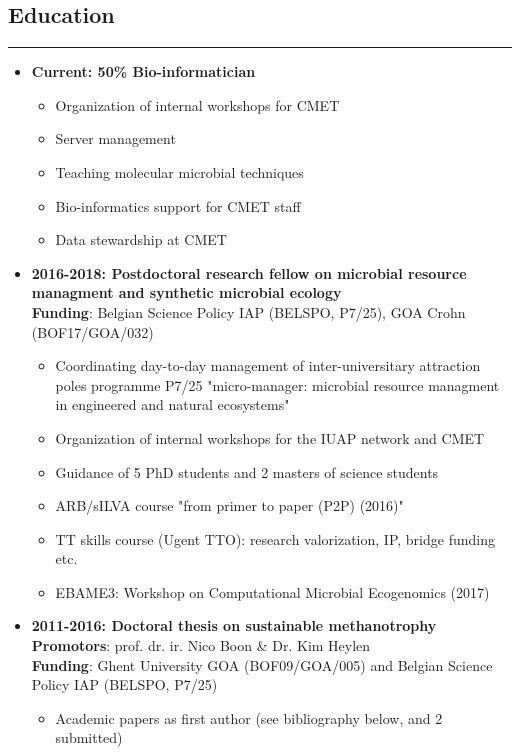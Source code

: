 \documentclass[a4paper,11pt,oneside]{article}
\begin{document}
\subsection*{Education}
\rule{\textwidth}{1pt}
\begin{itemize}
\item \textbf{Current: 50\% Bio-informatician}
  \begin{itemize}
    \item Organization of internal workshops for CMET
    \item Server management
    \item Teaching molecular microbial techniques
    \item Bio-informatics support for CMET staff
    \item Data stewardship at CMET
  \end{itemize}
\item \textbf{2016-2018: Postdoctoral research fellow on microbial resource managment and synthetic microbial ecology} \\
\textbf{Funding}: Belgian Science Policy IAP (BELSPO, P7/25), GOA Crohn (BOF17/GOA/032) 
    \begin{itemize}
      \item Coordinating day-to-day management of inter-universitary attraction poles programme P7/25 "micro-manager: microbial resource managment in engineered and natural ecosystems"
      \item Organization of internal workshops for the IUAP network and CMET
      \item Guidance of 5 PhD students and 2 masters of science students
      \item ARB/sILVA course "from primer to paper (P2P) (2016)"
      \item TT skills course (Ugent TTO): research valorization, IP, bridge funding etc.
      \item EBAME3: Workshop on Computational Microbial Ecogenomics (2017)
    \end{itemize}
\item \textbf{2011-2016: Doctoral thesis on sustainable methanotrophy}\\
\textbf{Promotors}: prof. dr. ir. Nico Boon \& Dr. Kim Heylen \\
\textbf{Funding}: Ghent University GOA (BOF09/GOA/005) and Belgian Science Policy IAP (BELSPO, P7/25)
    \begin{itemize}
      \item Academic papers as first author (see bibliography below, \cite{kerckhof2014optimized} and 2 submitted)

\end{itemize}
\end{itemize}
\end{document}
